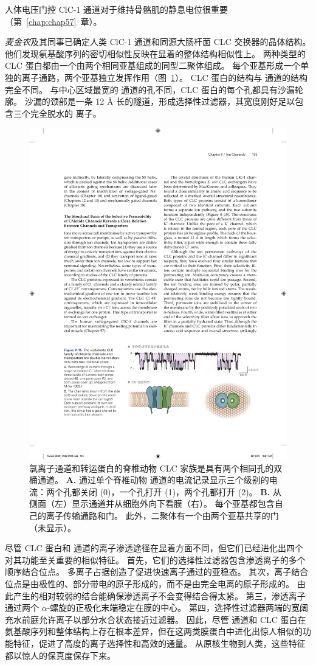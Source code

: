 人体电压门控 ClC-1 通道对于维持骨骼肌的静息电位很重要（第~\ref{chap:chap57}~章）。


\textit{麦金农}及其同事已确定人类 ClC-1 通道和同源大肠杆菌 CLC 交换器的晶体结构。
他们发现氨基酸序列的密切相似性反映在显着的整体结构相似性上。
两种类型的 CLC 蛋白都由一个由两个相同亚基组成的同型二聚体组成。
每个亚基形成一个单独的离子通路，两个亚基独立发挥作用（图~\ref{fig:8_15}）。
CLC 蛋白的结构与  通道的结构完全不同。
与中心区域最宽的  通道的孔不同，CLC 蛋白的每个孔都具有沙漏轮廓。
沙漏的颈部是一条 12 Å 长的隧道，形成选择性过滤器，其宽度刚好足以包含三个完全脱水的  离子。


\begin{figure}[htbp]
	\centering
	\includegraphics[width=0.75\linewidth]{chap08/fig_8_15}
	\caption{氯离子通道和转运蛋白的脊椎动物 CLC 家族是具有两个相同孔的双桶通道。
		\textbf{A.} 通过单个脊椎动物  通道的电流记录显示三个级别的电流：两个孔都关闭 (0)，一个孔打开 (1)，两个孔都打开 (2)。 
		\textbf{B.} 从侧面（左）显示通道并从细胞外向下看膜（右）。
		每个亚基都包含自己的离子传输通路和门。
		此外，二聚体有一个由两个亚基共享的门（未显示）。}
	\label{fig:8_15}
\end{figure}


尽管 CLC 蛋白和  通道的离子渗透途径在显着方面不同，但它们已经进化出四个对其功能至关重要的相似特征。
首先，它们的选择性过滤器包含渗透离子的多个顺序结合位点。
多离子占据创造了促进快速离子通过的亚稳态。
其次，离子结合位点是由极性的、部分带电的原子形成的，而不是由完全电离的原子形成的。
由此产生的相对较弱的结合能确保渗透离子不会变得结合得太紧。
第三，渗透离子通过两个 $\alpha$-螺旋的正极化末端稳定在膜的中心。
第四，选择性过滤器两端的宽阔充水前庭允许离子以部分水合状态接近过滤器。
因此，尽管  通道和 CLC 蛋白在氨基酸序列和整体结构上存在根本差异，但在这两类膜蛋白中进化出惊人相似的功能特征，促进了高度的离子选择性和高效的通量。 
从原核生物到人类，这些特征都以惊人的保真度保存下来。


